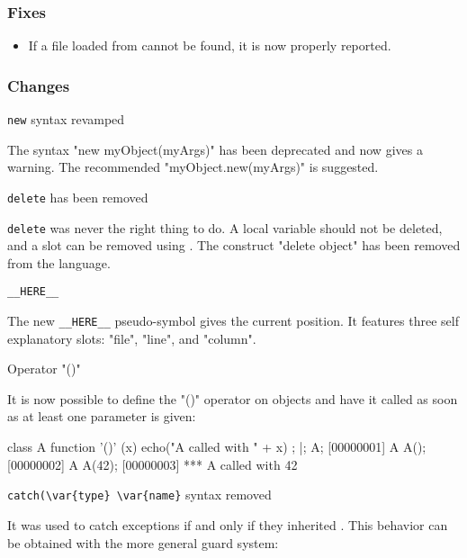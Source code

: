 \subsubsection{Fixes}

\begin{itemize}
\item If a file loaded from  cannot be found, it is now
  properly reported.
\end{itemize}


\subsubsection{Changes}

\begin{description}
\item \lstinline|new| syntax revamped

  The syntax "new myObject(myArgs)" has been deprecated and now gives a
  warning. The recommended "myObject.new(myArgs)" is suggested.

\item \lstinline|delete| has been removed

  \lstinline|delete| was never the right thing to do. A local variable
  should not be deleted, and a slot can be removed using
  .  The construct "delete object" has been
  removed from the language.

\item \lstinline|__HERE__|

  The new \lstinline|__HERE__| pseudo-symbol gives the current position.  It
  features three self explanatory slots: "file", "line", and "column".

\item Operator "()"

  It is now possible to define the "()" operator on objects and have it
  called as soon as at least one parameter is given:

\begin{urbiscript}
class A {
  function '()' (x) { echo("A called with " + x) };
}|;
A;
[00000001] A
A();
[00000002] A
A(42);
[00000003] *** A called with 42
\end{urbiscript}

\item \lstinline|catch(\var{type} \var{name}| syntax removed

  It was used to catch exceptions if and only if they inherited
  . This behavior can be obtained with the more general guard
  system:


\end{description}
